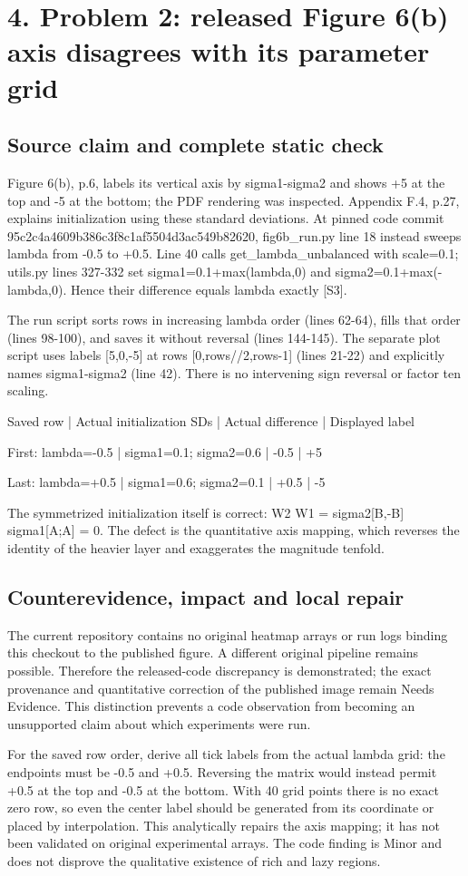 \documentclass[10pt]{article}
\begin{document}
\section*{4. Problem 2: released Figure 6(b) axis disagrees with its parameter grid}
\subsection*{Source claim and complete static check}
Figure 6(b), p.6, labels its vertical axis by sigma1-sigma2 and shows +5 at the top and -5 at the bottom; the PDF rendering was inspected. Appendix F.4, p.27, explains initialization using these standard deviations. At pinned code commit 95c2c4a4609b386c3f8c1af5504d3ac549b82620, fig6b\_run.py line 18 instead sweeps lambda from -0.5 to +0.5. Line 40 calls get\_lambda\_unbalanced with scale=0.1; utils.py lines 327-332 set sigma1=0.1+max(lambda,0) and sigma2=0.1+max(-lambda,0). Hence their difference equals lambda exactly [S3].\par
The run script sorts rows in increasing lambda order (lines 62-64), fills that order (lines 98-100), and saves it without reversal (lines 144-145). The separate plot script uses labels [5,0,-5] at rows [0,rows//2,rows-1] (lines 21-22) and explicitly names sigma1-sigma2 (line 42). There is no intervening sign reversal or factor ten scaling.\par
Saved row | Actual initialization SDs | Actual difference | Displayed label\par
First: lambda=-0.5 | sigma1=0.1; sigma2=0.6 | -0.5 | +5\par
Last: lambda=+0.5 | sigma1=0.6; sigma2=0.1 | +0.5 | -5\par
The symmetrized initialization itself is correct: W2 W1 = sigma2[B,-B] sigma1[A;A] = 0. The defect is the quantitative axis mapping, which reverses the identity of the heavier layer and exaggerates the magnitude tenfold.\par
\subsection*{Counterevidence, impact and local repair}
The current repository contains no original heatmap arrays or run logs binding this checkout to the published figure. A different original pipeline remains possible. Therefore the released-code discrepancy is demonstrated; the exact provenance and quantitative correction of the published image remain Needs Evidence. This distinction prevents a code observation from becoming an unsupported claim about which experiments were run.\par
For the saved row order, derive all tick labels from the actual lambda grid: the endpoints must be -0.5 and +0.5. Reversing the matrix would instead permit +0.5 at the top and -0.5 at the bottom. With 40 grid points there is no exact zero row, so even the center label should be generated from its coordinate or placed by interpolation. This analytically repairs the axis mapping; it has not been validated on original experimental arrays. The code finding is Minor and does not disprove the qualitative existence of rich and lazy regions.\par
\end{document}
